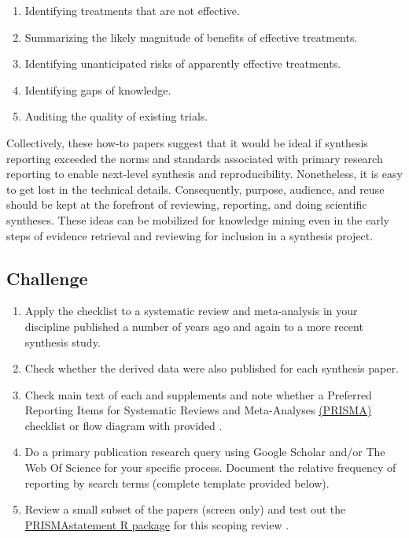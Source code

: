 \documentclass[
]{book}
\providecommand{\tightlist}{%
  \setlength{\itemsep}{0pt}\setlength{\parskip}{0pt}}
\begin{document}
\begin{enumerate}
\def\labelenumi{\arabic{enumi}.}
\tightlist
\item
  Identifying treatments that are not effective.\\
\item
  Summarizing the likely magnitude of benefits of effective treatments.\\
\item
  Identifying unanticipated risks of apparently effective treatments.\\
\item
  Identifying gaps of knowledge.\\
\item
  Auditing the quality of existing trials.
\end{enumerate}

Collectively, these how-to papers suggest that it would be ideal if synthesis reporting exceeded the norms and standards associated with primary research reporting to enable next-level synthesis and reproducibility. Nonetheless, it is easy to get lost in the technical details. Consequently, purpose, audience, and reuse should be kept at the forefront of reviewing, reporting, and doing scientific syntheses. These ideas can be mobilized for knowledge mining even in the early steps of evidence retrieval and reviewing for inclusion in a synthesis project.

\hypertarget{challenge-1}{%
\subsection*{Challenge}\label{challenge-1}}

\begin{enumerate}
\def\labelenumi{\arabic{enumi}.}
\tightlist
\item
  Apply the checklist to a systematic review and meta-analysis in your discipline published a number of years ago and again to a more recent synthesis study.\\
\item
  Check whether the derived data were also published for each synthesis paper.\\
\item
  Check main text of each and supplements and note whether a Preferred Reporting Items for Systematic Reviews and Meta-Analyses \href{http://www.prisma-statement.org}{(PRISMA)} checklist or flow diagram with provided \citep{RN7348}.\\
\item
  Do a primary publication research query using Google Scholar and/or The Web Of Science for your specific process. Document the relative frequency of reporting by search terms (complete template provided below).\\
\item
  Review a small subset of the papers (screen only) and test out the \href{https://cran.r-project.org/web/packages/PRISMAstatement/index.html}{PRISMAstatement R package} for this scoping review \citep{RN7353}.
\end{enumerate}
\end{document}

